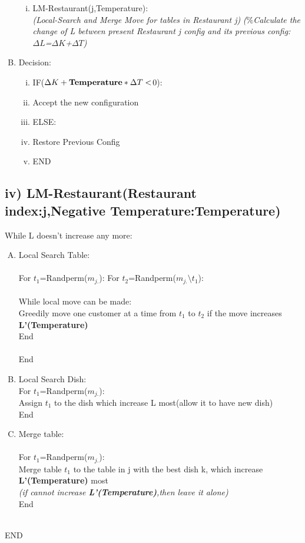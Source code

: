 \documentclass{article}
\begin{document}
\begin{spacing}{1.1}
\begin{enumerate}[(A)]
\begin{enumerate}[(i)]
\item LM-Restaurant(j,Temperature):\\
\small{\emph{(Local-Search and Merge Move for tables in Restaurant j)}}
\small{\emph{($\%$Calculate the change of L between present Restaurant j config and its previous config: $\Delta L$=$\Delta K$+$\Delta T$)}}
\end{enumerate}
\item Decision:\\
\begin{enumerate}[(i)]
\item IF($\Delta K+{\bf Temperature}*\Delta T<$0):
\item Accept the new configuration
\item ELSE:
\item Restore Previous Config
\item END
\end{enumerate}
\end{enumerate}


\subsection{iv) LM-Restaurant(Restaurant index:j,Negative Temperature:Temperature)}
While L doesn't increase any more:\\
\begin{enumerate}[(A)]
\item Local Search Table:\\ \\
For $t_{1}$=Randperm($m_{j.}$):
For $t_{2}$=Randperm($m_{j.}\setminus t_{1}$):\\ \\
While local move can be made:\\
Greedily move one customer at a time from $t_{1}$ to $t_{2}$ if the move increases {\bf L'(Temperature)} \\
End\\ \\
End
\item Local Search Dish:\\
For $t_{1}$=Randperm($m_{j.}$):\\
Assign $t_{1}$ to the dish which increase L most(allow it to have new dish)\\
End
\item Merge table:\\ \\
 For $t_{1}$=Randperm($m_{j.}$):\\
 Merge table $t_{1}$ to the table in j with the best dish k, which increase {\bf L'(Temperature)} most\\
 \small{\emph{(if cannot increase {\bf L'(Temperature)},then leave it alone)}}\\
 End\\ \\
\end{enumerate}  
END

\end{spacing}
\end{document}
